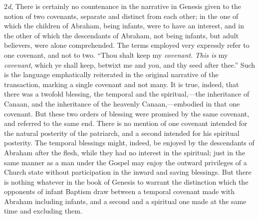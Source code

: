 \documentclass[english,]{book}
\begin{document}
2\emph{d}, There is certainly no countenance in the narrative in Genesis given to the notion of two covenants, separate and distinct from each other; in the one of which the children of Abraham, being infants, were to have an interest, and in the other of which the descendants of Abraham, not being infants, but adult believers, were alone comprehended. The terms employed very expressly refer to one covenant, and not to two. ``Thou shalt keep my \emph{covenant}. \emph{This is} my \emph{covenant}, which ye shall keep, betwixt me and you, and thy seed after thee.'' Such is the language emphatically reiterated in the original narrative of the transaction, marking a single covenant and not many. It is true, indeed, that there was a twofold blessing, the temporal and the spiritual,---the inheritance of Canaan, and the inheritance of the heavenly Canaan,---embodied in that one covenant. But these two orders of blessing were promised by the same covenant, and referred to the same end. There is no mention of one covenant intended for the natural posterity of the patriarch, and a second intended for his spiritual posterity. The temporal blessings might, indeed, be enjoyed by the descendants of Abraham after the flesh, while they had no interest in the spiritual; just in the same manner as a man under the Gospel may enjoy the outward privileges of a Church state without participation in the inward and saving blessings. But there is nothing whatever in the book of Genesis to warrant the distinction which the opponents of infant Baptism draw between a temporal covenant made with Abraham including infants, and a second and a spiritual one made at the same time and excluding them.
\end{document}
